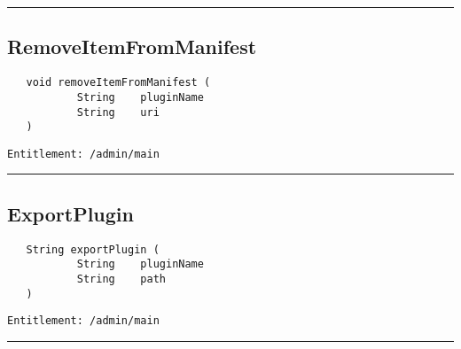 \rule{12cm}{2pt}
\subsection{RemoveItemFromManifest}
\label{Api:RemoveItemFromManifest}
\begin{Verbatim}
   void removeItemFromManifest (
           String    pluginName
           String    uri
   )
\end{Verbatim}
\begin{Verbatim}[formatcom=\color{Maroon}]
  Entitlement: /admin/main
\end{Verbatim}



\rule{12cm}{2pt}
\subsection{ExportPlugin}
\label{Api:ExportPlugin}
\begin{Verbatim}
   String exportPlugin (
           String    pluginName
           String    path
   )
\end{Verbatim}
\begin{Verbatim}[formatcom=\color{Maroon}]
  Entitlement: /admin/main
\end{Verbatim}



\rule{12cm}{2pt}
